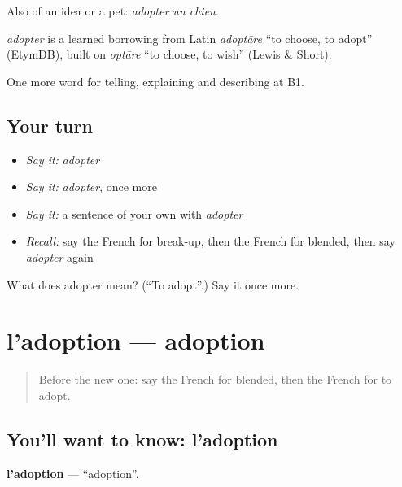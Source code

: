 Also of an idea or a pet: \emph{adopter un chien}.

\begin{cousinweb}
\emph{adopter} is a learned borrowing from Latin \emph{adoptāre} \textquotedblleft{}to choose, to adopt\textquotedblright{} (EtymDB), built on \emph{optāre} \textquotedblleft{}to choose, to wish\textquotedblright{} (Lewis \& Short).
\end{cousinweb}

\begin{grammarlens}[title={What you've built}]
One more word for telling, explaining and describing at B1.
\end{grammarlens}

\subsection*{Your turn}
\begin{itemize}
\raggedright
  \item \emph{Say it:} \emph{adopter}
  \item \emph{Say it:} \emph{adopter}, once more
  \item \emph{Say it:} a sentence of your own with \emph{adopter}
  \item \emph{Recall:} say the French for break-up, then the French for blended, then say \emph{adopter} again
\end{itemize}

\begin{tcolorbox}[breakable,colback=teal!4,colframe=teal!35!black,title={Before you move on}]
What does adopter mean? (\textquotedblleft{}To adopt\textquotedblright{}.) Say it once more.
\end{tcolorbox}
\section[l'adoption]{l'adoption — adoption}

\label{lesson:FR-C492-adoption}



\begin{quote}
Before the new one: say the French for blended, then the French for to adopt.
\end{quote}

\subsection*{You'll want to know: l'adoption}
\textbf{l'adoption} — \textquotedblleft{}adoption\textquotedblright{}.

